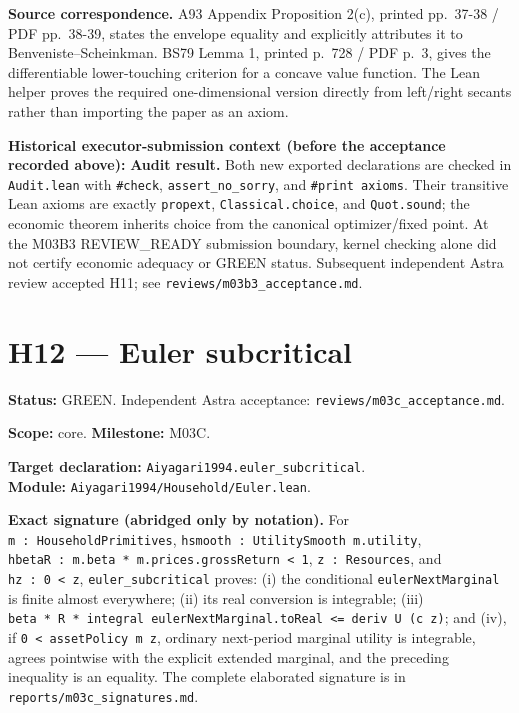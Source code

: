 \documentclass[
  11pt,
]{article}
\let\LedgerOriginalTexttt\texttt
\renewcommand{\texttt}[1]{{\small\LedgerOriginalTexttt{#1}}}
\begin{document}
\textbf{Source correspondence.} A93 Appendix Proposition 2(c), printed
pp.~37-38 / PDF pp.~38-39, states the envelope equality and explicitly
attributes it to Benveniste--Scheinkman. BS79 Lemma 1, printed p.~728 /
PDF p.~3, gives the differentiable lower-touching criterion for a
concave value function. The Lean helper proves the required
one-dimensional version directly from left/right secants rather than
importing the paper as an axiom.

\textbf{Historical executor-submission context (before the acceptance
recorded above):} \textbf{Audit result.} Both new exported declarations
are checked in \texttt{Audit.lean} with \texttt{\#check},
\texttt{assert\_no\_sorry}, and \texttt{\#print\ axioms}. Their
transitive Lean axioms are exactly \texttt{propext},
\texttt{Classical.choice}, and \texttt{Quot.sound}; the economic theorem
inherits choice from the canonical optimizer/fixed point. At the M03B3
REVIEW\_READY submission boundary, kernel checking alone did not certify
economic adequacy or GREEN status. Subsequent independent Astra review
accepted H11; see \texttt{reviews/m03b3\_acceptance.md}.

\section{H12 --- Euler subcritical}\label{h12-euler-subcritical}

\textbf{Status:} GREEN. Independent Astra acceptance:
\texttt{reviews/m03c\_acceptance.md}.

\textbf{Scope:} core. \textbf{Milestone:} M03C.

\textbf{Target declaration:} \texttt{Aiyagari1994.euler\_subcritical}.\\
\textbf{Module:} \texttt{Aiyagari1994/Household/Euler.lean}.

\textbf{Exact signature (abridged only by notation).} For
\texttt{m\ :\ HouseholdPrimitives},
\texttt{hsmooth\ :\ UtilitySmooth\ m.utility},
\texttt{hbetaR\ :\ m.beta\ *\ m.prices.grossReturn\ \textless{}\ 1},
\texttt{z\ :\ Resources}, and \texttt{hz\ :\ 0\ \textless{}\ z},
\texttt{euler\_subcritical} proves: (i) the conditional
\texttt{eulerNextMarginal} is finite almost everywhere; (ii) its real
conversion is integrable; (iii)
\texttt{beta\ *\ R\ *\ integral\ eulerNextMarginal.toReal\ \textless{}=\ deriv\ U\ (c\ z)};
and (iv), if \texttt{0\ \textless{}\ assetPolicy\ m\ z}, ordinary
next-period marginal utility is integrable, agrees pointwise with the
explicit extended marginal, and the preceding inequality is an equality.
The complete elaborated signature is in
\texttt{reports/m03c\_signatures.md}.
\end{document}
